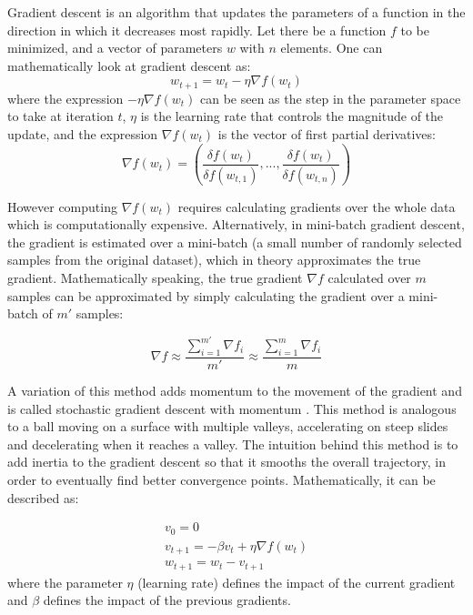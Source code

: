     Gradient descent is an algorithm that updates the parameters of a function in the direction in which it decreases most rapidly. Let there be a function $f$ to be minimized, and a vector of parameters $w$ with $n$ elements. One can mathematically look at gradient descent as:
    \begin{equation}
        w_{t+1}=w_t -\eta \nabla f(w_t)
        \label{eq:gradient_update}
    \end{equation}
    where the expression $-\eta \nabla f(w_t)$ can be seen as the step in the parameter space to take at iteration $t$, $\eta$ is the learning rate that controls the magnitude of the update, and the expression $\nabla f(w_t)$ is the vector of first partial derivatives:
    \begin{equation}
        \nabla f(w_t) = (\frac{\delta f(w_t)}{\delta f(w_{t,1})},...,\frac{\delta f(w_t)}{\delta f(w_{t,n})})
        \label{eq:first_derivative}
    \end{equation}
    
    However computing $\nabla f(w_t)$ requires calculating gradients over the whole data which is computationally expensive. Alternatively, in mini-batch gradient descent, the gradient is estimated over a mini-batch (a small number of randomly selected samples from the original dataset), which in theory approximates the true gradient. Mathematically speaking, the true gradient $\nabla f$ calculated over $m$ samples can be approximated by simply calculating the gradient over a mini-batch of $m'$ samples:
    
    \begin{equation}
        \nabla f \approx \frac{\sum_{i=1}^{m'} \nabla f_i}{m'} \approx \frac{\sum_{i=1}^m \nabla f_{i}}{m}
        \label{eq:mini_batch_gradient}
    \end{equation}
    
    A variation of this method adds momentum to the movement of the gradient and is called stochastic gradient descent with momentum \cite{momentum}. This method is analogous to a ball moving on a surface with multiple valleys, accelerating on steep slides and decelerating when it reaches a valley. The intuition behind this method is to add inertia to the gradient descent so that it smooths the overall trajectory, in order to eventually find better convergence points. Mathematically, it can be described as:
    
    \begin{equation}
        \begin{split}
            v_0 = 0\\
            v_{t+1} = -\beta v_t + \eta \nabla f(w_t)\\
            w_{t+1} = w_t - v_{t+1}
        \end{split}
        \label{eq:sgd_momentum}
    \end{equation}  
    where the parameter $\eta$ (learning rate) defines the impact of the current gradient and $\beta$ defines the impact of the previous gradients.
    
